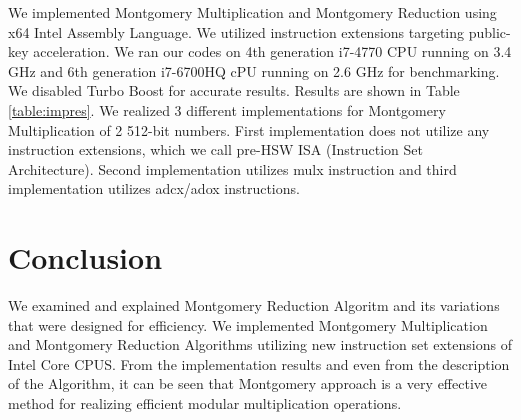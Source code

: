 \documentclass[twocolumn]{svjour3}          %
\begin{document}
We implemented Montgomery Multiplication and Montgomery Reduction using x64 Intel Assembly Language. We utilized instruction extensions targeting public-key acceleration. We ran our codes on 4th generation i7-4770 CPU running on 3.4 GHz and 6th generation i7-6700HQ cPU running on 2.6 GHz for benchmarking. We disabled Turbo Boost for accurate results. Results are shown in Table \ref{table:impres}. We realized 3 different implementations for Montgomery Multiplication of 2 512-bit numbers. First implementation does not utilize any instruction extensions, which we call pre-HSW ISA (Instruction Set Architecture). Second implementation utilizes mulx instruction and third implementation utilizes adcx/adox instructions.




\section{Conclusion}
\label{sec:conc}
We examined and explained Montgomery Reduction Algoritm and its variations that were designed for efficiency. We implemented Montgomery Multiplication and Montgomery Reduction Algorithms utilizing new instruction set extensions of Intel Core CPUS. From the implementation results and even from the description of the Algorithm, it can be seen that Montgomery approach is a very effective method for realizing efficient modular multiplication operations.
\end{document}

